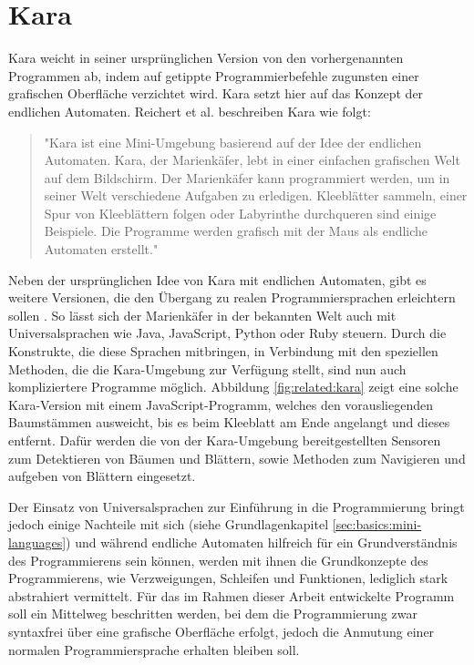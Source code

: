 \section{Kara}
\label{sec:related:kara}

Kara weicht in seiner ursprünglichen Version von den vorhergenannten Programmen ab, indem auf getippte Programmierbefehle zugunsten einer grafischen Oberfläche verzichtet wird. Kara setzt hier auf das Konzept der endlichen Automaten. Reichert et al. beschreiben Kara wie folgt:

\begin{quote}
    "Kara ist eine Mini-Um\-ge\-bung basierend auf der Idee der endlichen Automaten. Kara, der Marienkäfer, lebt in einer einfachen grafischen Welt auf dem Bildschirm. Der Marienkäfer kann programmiert werden, um in seiner Welt verschiedene Aufgaben zu erledigen. Kleeblätter sammeln, einer Spur von Kleeblättern folgen oder Labyrinthe durchqueren sind einige Beispiele. Die Programme werden grafisch mit der Maus als endliche Automaten erstellt."~\cite[28]{reichert2004}
\end{quote}

Neben der ursprünglichen Idee von Kara mit endlichen Automaten, gibt es weitere Versionen, die den Übergang zu realen Programmiersprachen erleichtern sollen \cite{kara2017}. So lässt sich der Marienkäfer in der bekannten Welt auch mit Universalsprachen wie Java, JavaScript, Python oder Ruby steuern. Durch die Konstrukte, die diese Sprachen mitbringen, in Verbindung mit den speziellen Methoden, die die Kara-Um\-ge\-bung zur Verfügung stellt, sind nun auch kompliziertere Programme möglich. Abbildung \ref{fig:related:kara} zeigt eine solche Kara-Ver\-si\-on mit einem Java\-Script-Pro\-gramm, welches den vorausliegenden Baumstämmen ausweicht, bis es beim Kleeblatt am Ende angelangt und dieses entfernt. Dafür werden die von der Kara-Um\-ge\-bung bereitgestellten Sensoren zum Detektieren von Bäumen und Blättern, sowie Methoden zum Navigieren und aufgeben von Blättern eingesetzt.

Der Einsatz von Universalsprachen zur Einführung in die Programmierung bringt jedoch einige Nachteile mit sich (siehe Grundlagenkapitel \ref{sec:basics:mini-languages}) und während endliche Automaten hilfreich für ein Grundverständnis des Programmierens sein können, werden mit ihnen die Grundkonzepte des Programmierens, wie Verzweigungen, Schleifen und Funktionen, lediglich stark abstrahiert vermittelt. Für das im Rahmen dieser Arbeit entwickelte Programm soll ein Mittelweg beschritten werden, bei dem die Programmierung zwar syntaxfrei über eine grafische Oberfläche erfolgt, jedoch die Anmutung einer normalen Programmiersprache erhalten bleiben soll.

